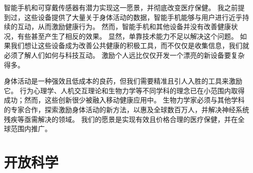 智能手机和可穿戴传感器有潜力实现这一愿景，并彻底改变医疗保健。
我之前提到过，这些设备提供了大量关于身体活动的数据，智能手机能够与用户进行近乎持续的互动，从而激励健康行为。
然而，智能手机和其他设备并没有改善健康状况，有些甚至产生了相反的效果\cite{jakicic2016effect}。
显然，单靠技术能力不足以解决这个问题。
如果我们想让这些设备成为改善公共健康的积极工具，而不仅仅是收集信息，我们就必须了解人们如何与科技互动。
激励个人远比仅仅开发一个漂亮的新设备要复杂得多。


身体活动是一种强效且低成本的良药，但我们需要精准且引人入胜的工具来激励它。
行为心理学、人机交互理论和生物力学等不同学科的理念已在小范围内取得成功；然而，这些创新很少被融入移动健康应用中。
生物力学家必须与其他学科的专家合作，探索激励身体活动的新方法，以惠及全球数百万人，并解决神经系统残疾等亟需解决的领域。
我们的愿景是实现有效且价格合理的医疗保健，并在全球范围内推广。

\section{开放科学}









